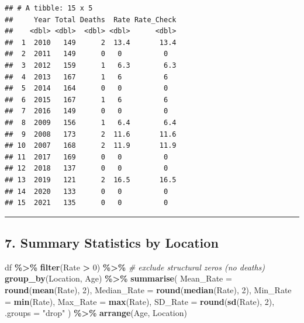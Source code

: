 \documentclass[
]{article}
\newenvironment{Shaded}{\begin{snugshade}}{\end{snugshade}}
\newcommand{\AttributeTok}[1]{\textcolor[rgb]{0.13,0.29,0.53}{#1}}
\newcommand{\CommentTok}[1]{\textcolor[rgb]{0.56,0.35,0.01}{\textit{#1}}}
\newcommand{\DecValTok}[1]{\textcolor[rgb]{0.00,0.00,0.81}{#1}}
\newcommand{\FunctionTok}[1]{\textcolor[rgb]{0.13,0.29,0.53}{\textbf{#1}}}
\newcommand{\NormalTok}[1]{#1}
\newcommand{\SpecialCharTok}[1]{\textcolor[rgb]{0.81,0.36,0.00}{\textbf{#1}}}
\newcommand{\StringTok}[1]{\textcolor[rgb]{0.31,0.60,0.02}{#1}}
\begin{document}
\begin{verbatim}
## # A tibble: 15 x 5
##     Year Total Deaths  Rate Rate_Check
##    <dbl> <dbl>  <dbl> <dbl>      <dbl>
##  1  2010   149      2  13.4       13.4
##  2  2011   149      0   0          0  
##  3  2012   159      1   6.3        6.3
##  4  2013   167      1   6          6  
##  5  2014   164      0   0          0  
##  6  2015   167      1   6          6  
##  7  2016   149      0   0          0  
##  8  2009   156      1   6.4        6.4
##  9  2008   173      2  11.6       11.6
## 10  2007   168      2  11.9       11.9
## 11  2017   169      0   0          0  
## 12  2018   137      0   0          0  
## 13  2019   121      2  16.5       16.5
## 14  2020   133      0   0          0  
## 15  2021   135      0   0          0
\end{verbatim}

\begin{center}\rule{0.5\linewidth}{0.5pt}\end{center}

\subsection{7. Summary Statistics by
Location}\label{summary-statistics-by-location}

\begin{Shaded}
\begin{Highlighting}[]
\NormalTok{df }\SpecialCharTok{\%\textgreater{}\%}
  \FunctionTok{filter}\NormalTok{(Rate }\SpecialCharTok{\textgreater{}} \DecValTok{0}\NormalTok{) }\SpecialCharTok{\%\textgreater{}\%}             \CommentTok{\# exclude structural zeros (no deaths)}
  \FunctionTok{group\_by}\NormalTok{(Location, Age) }\SpecialCharTok{\%\textgreater{}\%}
  \FunctionTok{summarise}\NormalTok{(}
    \AttributeTok{Mean\_Rate   =} \FunctionTok{round}\NormalTok{(}\FunctionTok{mean}\NormalTok{(Rate), }\DecValTok{2}\NormalTok{),}
    \AttributeTok{Median\_Rate =} \FunctionTok{round}\NormalTok{(}\FunctionTok{median}\NormalTok{(Rate), }\DecValTok{2}\NormalTok{),}
    \AttributeTok{Min\_Rate    =} \FunctionTok{min}\NormalTok{(Rate),}
    \AttributeTok{Max\_Rate    =} \FunctionTok{max}\NormalTok{(Rate),}
    \AttributeTok{SD\_Rate     =} \FunctionTok{round}\NormalTok{(}\FunctionTok{sd}\NormalTok{(Rate), }\DecValTok{2}\NormalTok{),}
    \AttributeTok{.groups     =} \StringTok{"drop"}
\NormalTok{  ) }\SpecialCharTok{\%\textgreater{}\%}
  \FunctionTok{arrange}\NormalTok{(Age, Location)}
\end{Highlighting}
\end{Shaded}
\end{document}
